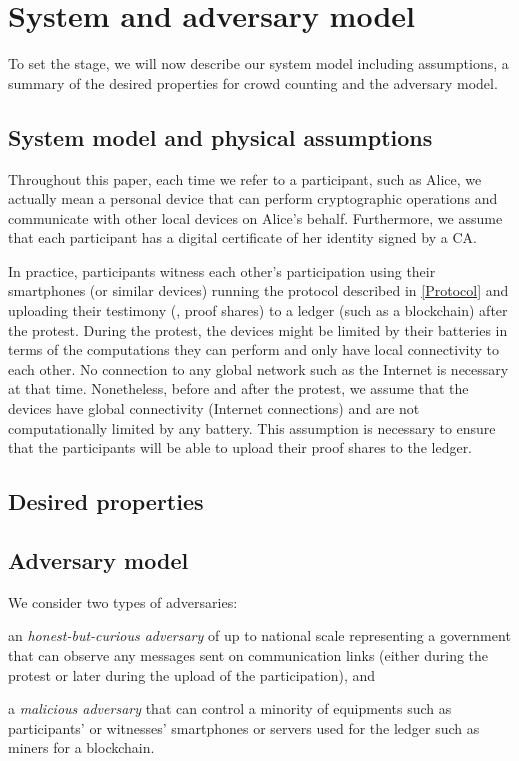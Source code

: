 \section{System and adversary model}%
\label{system-model}

To set the stage, we will now describe our system model including assumptions, a summary of the desired properties for crowd counting and the adversary model.

\subsection{System model and physical assumptions}
\label{assumptions}

Throughout this paper, each time we refer to a participant, such as Alice, we actually mean a personal device that can perform cryptographic operations and communicate with other local devices on Alice's behalf. 
Furthermore, we assume that each participant has a digital certificate of her identity signed by a \ac{CA}.

In practice, participants witness each other's participation using their smartphones (or similar devices) running the protocol described in \cref{Protocol} and uploading their testimony (\ie, proof shares) to a ledger (such as a blockchain) after the protest. 
During the protest, the devices might be limited by their batteries in terms of the computations they can perform and only have local connectivity to each other.
No connection to any global network such as the Internet is necessary at that time.  
Nonetheless, before and after the protest, we assume that the devices have global connectivity (\ie Internet connections) and are not computationally limited by any battery.
This assumption is necessary to ensure that the participants will be able to upload their proof shares to the ledger.

\subsection{Desired properties}


\subsection{Adversary model}
\label{adversary-model}

We consider two types of adversaries: 
\begin{enumerate*} 
\item an \emph{honest-but-curious adversary} of up to national scale representing a government that can observe any
messages sent on communication links (\ie either during the protest or later during the upload of the participation), and 
\item a \emph{malicious adversary} that can control a minority of equipments such as participants' or witnesses' smartphones or servers used for the ledger such as miners for a blockchain. 
\end{enumerate*}
